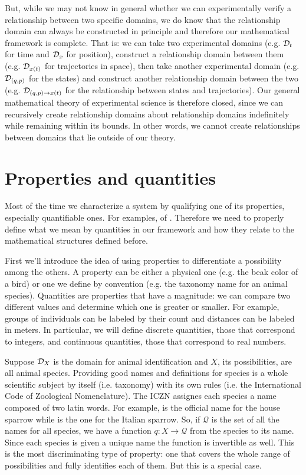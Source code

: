 \documentclass[11pt,letterpaper,fleqn]{memoir} %
\begin{document}
But, while we may not know in general whether we can experimentally verify a relationship between two specific domains, we do know that the relationship domain can always be constructed in principle and therefore our mathematical framework is complete. That is: we can take two experimental domains (e.g. $\mathcal{D}_t$ for time and $\mathcal{D}_x$ for position), construct a relationship domain between them (e.g. $\mathcal{D}_{x(t)}$ for trajectories in space), then take another experimental domain (e.g. $\mathcal{D}_{(q,p)}$ for the states) and construct another relationship domain between the two (e.g. $\mathcal{D}_{(q,p)\to x(t)}$ for the relationship between states and trajectories). Our general mathematical theory of experimental science is therefore closed, since we can recursively create relationship domains about relationship domains indefinitely while remaining within its bounds. In other words, we cannot create relationships between domains that lie outside of our theory.

\section{Properties and quantities}

Most of the time we characterize a system by qualifying one of its properties, especially quantifiable ones. For examples,  of . Therefore we need to properly define what we mean by quantities in our framework and how they relate to the mathematical structures defined before.

First we'll introduce the idea of using properties to differentiate a possibility among the others. A property can be either a physical one (e.g. the beak color of a bird) or one we define by convention (e.g. the taxonomy name for an animal species). Quantities are properties that have a magnitude: we can compare two different values and determine which one is greater or smaller. For example, groups of individuals can be labeled by their count and distances can be labeled in meters. In particular, we will define discrete quantities, those that correspond to integers, and continuous quantities, those that correspond to real numbers.

Suppose $\mathcal{D}_X$ is the domain for animal identification and $X$, its possibilities, are all animal species. Providing good names and definitions for species is a whole scientific subject by itself (i.e. taxonomy) with its own rules (i.e. the International Code of Zoological Nomenclature). The ICZN assignes each species a name composed of two latin words. For example,  is the official name for the house sparrow while  is the one for the Italian sparrow. So, if $\mathcal{Q}$ is the set of all the names for all species, we have a function $q: X \to \mathcal{Q}$ from the species to its name. Since each species is given a unique name the function is invertible as well. This is the most discriminating type of property: one that covers the whole range of possibilities and fully identifies each of them. But this is a special case.
\end{document}
